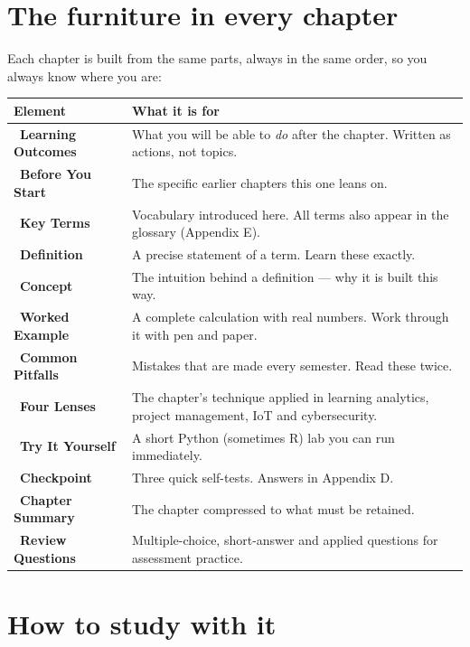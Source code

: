 \section*{The furniture in every chapter}

Each chapter is built from the same parts, always in the same order, so you
always know where you are:

\begin{longtable}{@{}L{4.6cm}L{10.6cm}@{}}
\toprule
{}
\textbf{Element} & \textbf{What it is for} \\
\midrule
\endhead
{}~\textbf{Learning Outcomes} & What you will be able to \emph{do} after the chapter. Written as actions, not topics. \\
~\textbf{Before You Start} & The specific earlier chapters this one leans on. \\
~\textbf{Key Terms} & Vocabulary introduced here. All terms also appear in the glossary (Appendix E). \\
~\textbf{Definition} & A precise statement of a term. Learn these exactly. \\
~\textbf{Concept} & The intuition behind a definition --- why it is built this way. \\
~\textbf{Worked Example} & A complete calculation with real numbers. Work through it with pen and paper. \\
~\textbf{Common Pitfalls} & Mistakes that are made every semester. Read these twice. \\
~\textbf{Four Lenses} & The chapter's technique applied in learning analytics, project management, IoT and cybersecurity. \\
~\textbf{Try It Yourself} & A short Python (sometimes R) lab you can run immediately. \\
~\textbf{Checkpoint} & Three quick self-tests. Answers in Appendix D. \\
~\textbf{Chapter Summary} & The chapter compressed to what must be retained. \\
~\textbf{Review Questions} & Multiple-choice, short-answer and applied questions for assessment practice. \\
\bottomrule
\end{longtable}

\section*{How to study with it}

